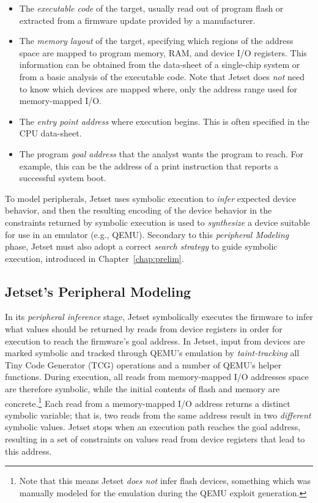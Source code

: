 \begin{itemize}[noitemsep, leftmargin=12pt]
\item The \emph{executable code} of the target, usually read out of program flash or extracted from a firmware update provided by a manufacturer.
\item The \emph{memory layout} of the target, specifying which regions of the address space are mapped to program memory, RAM, and device I/O registers.
This information can be obtained from the data-sheet of a single-chip system or from a basic analysis of the executable code. Note that Jetset does \emph{not} need to know which devices are mapped where, only the address range used for memory-mapped I/O.
\item The \emph{entry point address} where execution begins.
This is often specified in the CPU data-sheet.
\item The program \emph{goal address} that the analyst wants the program to reach.
For example, this can be the address of a print instruction that reports a successful system boot.
\end{itemize}

To model peripherals, Jetset uses symbolic execution to \emph{infer} expected device behavior, and then the resulting encoding of the device behavior in the constraints returned by symbolic execution is used to \emph{synthesize} a device suitable for use in an emulator (e.g., QEMU).
Secondary to this \emph{peripheral Modeling} phase, Jetset must also adopt a correct \emph{search strategy} to guide symbolic execution, introduced in Chapter~\ref{chap:prelim}.

\subsection{Jetset's Peripheral Modeling}
In its \emph{peripheral inference} stage, Jetset symbolically executes the firmware to infer what values should be returned by reads from device registers in order for execution to reach the firmware's goal address.
In Jetset, input from devices are marked symbolic and tracked through QEMU's emulation by \emph{taint-tracking} all Tiny Code Generator (TCG) operations and a number of QEMU's helper functions.
During execution, all reads from memory-mapped I/O addresses space are therefore symbolic, while the initial contents of flash and memory are concrete.\footnote{Note that this means Jetset \emph{does not} infer flash devices, something which was manually modeled for the emulation during the QEMU exploit generation.}
Each read from a memory-mapped I/O address returns a distinct symbolic variable; that is, two reads from the same address result in two \emph{different} symbolic values.
Jetset stops when an execution path reaches the goal address, resulting in a set of constraints on values read from device registers that lead to this address.


